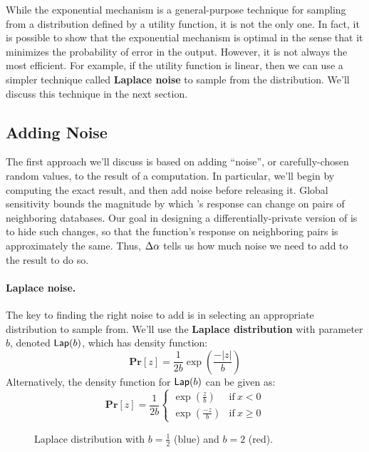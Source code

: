 \documentclass[11pt,twoside]{scrartcl}
\begin{document}
While the exponential mechanism is a general-purpose technique for sampling from a distribution defined by a utility function, it is not the only one. In fact, it is possible to show that the exponential mechanism is optimal in the sense that it minimizes the probability of error in the output. However, it is not always the most efficient. For example, if the utility function is linear, then we can use a simpler technique called \textbf{Laplace noise} to sample from the distribution. We'll discuss this technique in the next section.

\subsection{Adding Noise} 
The first approach we'll discuss is based on adding ``noise'', or carefully-chosen random values, to the result of a computation. In particular, we'll begin by computing the exact result, and then add noise before releasing it. 
Global sensitivity bounds the magnitude by which \san's response can change on pairs of neighboring databases. Our goal in designing a differentially-private version of \san is to hide such changes, so that the function's response on neighboring pairs is approximately the same. Thus, $\Delta\alpha$ tells us how much noise we need to add to the result to do so.

\paragraph{Laplace noise.}
The key to finding the right noise to add is in selecting an appropriate distribution to sample from. We'll use the \textbf{Laplace distribution} with parameter $b$, denoted $\mathsf{Lap}(b)$, which has density function:
\begin{equation}
\label{eq:lap}
\mathbf{Pr}[z] = \frac{1}{2b}\exp\left(\frac{-|z|}{b}\right)
\end{equation}
Alternatively, the density function for $\mathsf{Lap}(b)$ can be given as:
\begin{equation}
\label{eq:lap2}
\mathbf{Pr}[z] = 
\frac{1}{2b}
\left\{
\begin{array}{ll}
%
\exp\left(\frac{z}{b}\right) & \mathrm{if\ } x < 0 \\
\exp\left(\frac{-z}{b}\right) & \mathrm{if\ } x \ge 0 
\end{array}
\right.
\end{equation}

\begin{figure}
\centering
{}
\label{fig:laplace}
\caption{Laplace distribution with $b=\frac{1}{2}$ (blue) and $b = 2$ (red).}
\end{figure}
\end{document}
